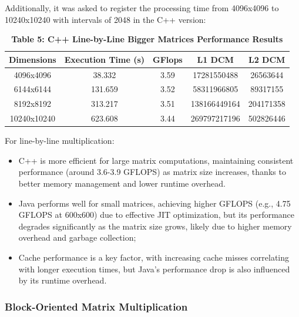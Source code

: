 \documentclass{article}
\begin{document}
Additionally, it was asked to register the processing time from 4096x4096 to 10240x10240 with intervals of 2048 in the C++ version:

\begin{table}[H]
\centering

\caption*{\textbf{Table 5: C++ Line-by-Line Bigger Matrices Performance Results}}
\begin{tabular}{||c | c | c | c | c||} 
 \hline
 \textbf{Dimensions} & \textbf{Execution Time (s)} & \textbf{GFlops} & \textbf{L1 DCM} & \textbf{L2 DCM} \\  
 \hline \hline
 4096x4096  & 38.332   & 3.59   & 17281550488   & 26563644    \\  
 \hline
 6144x6144  & 131.659  & 3.52   & 58311966805   & 89317155    \\  
 \hline
 8192x8192  & 313.217  & 3.51   & 138166449164  & 204171358   \\  
 \hline
 10240x10240 & 623.608  & 3.44   & 269797217196  & 502826446   \\  
 \hline
\end{tabular}
\end{table}

For line-by-line multiplication:

\begin{itemize}
    \item C++ is more efficient for large matrix computations, maintaining consistent performance (around 3.6-3.9 GFLOPS) as matrix size increases, thanks to better memory management and lower runtime overhead.
    \item Java performs well for small matrices, achieving higher GFLOPS (e.g., 4.75 GFLOPS at 600x600) due to effective JIT optimization, but its performance degrades significantly as the matrix size grows, likely due to higher memory overhead and garbage collection;
    \item Cache performance is a key factor, with increasing cache misses correlating with longer execution times, but Java's performance drop is also influenced by its runtime overhead.
\end{itemize}

\subsubsection{Block-Oriented Matrix Multiplication}
\end{document}
